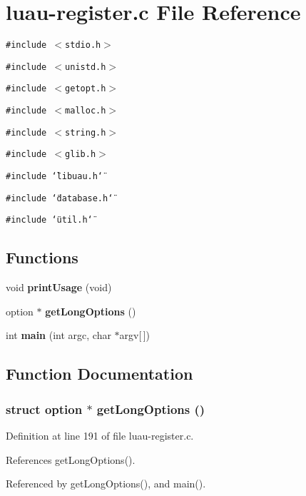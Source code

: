 \section{luau-register.c File Reference}
\label{luau-register_8c}
{\tt \#include $<$stdio.h$>$}\par
{\tt \#include $<$unistd.h$>$}\par
{\tt \#include $<$getopt.h$>$}\par
{\tt \#include $<$malloc.h$>$}\par
{\tt \#include $<$string.h$>$}\par
{\tt \#include $<$glib.h$>$}\par
{\tt \#include \char`\"{}libuau.h\char`\"{}}\par
{\tt \#include \char`\"{}database.h\char`\"{}}\par
{\tt \#include \char`\"{}util.h\char`\"{}}\par
\subsection*{Functions}
\begin{CompactItemize}
\item 
void {\bf print\-Usage} (void)
\item 
option $\ast$ {\bf get\-Long\-Options} ()
\item 
int {\bf main} (int argc, char $\ast$argv[$\,$])
\end{CompactItemize}


\subsection{Function Documentation}
\subsubsection{\setlength{\rightskip}{0pt plus 5cm}struct option $\ast$ get\-Long\-Options ()\hspace{0.3cm}{\tt  [static]}}\label{luau-register_8c_a1}




Definition at line 191 of file luau-register.c.

References get\-Long\-Options().

Referenced by get\-Long\-Options(), and main().

